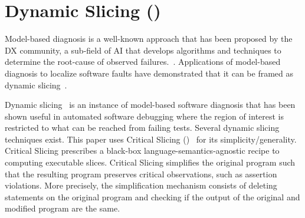 \documentclass{article}
\begin{document}

\section{Dynamic Slicing (\ds{})}
\label{sec:slicing}


Model-based diagnosis is a well-known approach that has been proposed by the
DX community, a sub-field of AI that develops algorithms and techniques to
determine the root-cause of observed failures.~\cite{REITER198757,DEKLEER200325}. Applications
of model-based diagnosis to localize software faults have demonstrated that it
can be framed as dynamic slicing~\cite{Mayer:2008:EMM:1642931.1642950,mayer2008prioritising}.

Dynamic slicing~\cite{Agrawal:1990:DPS:93542.93576}
is an instance of model-based software diagnosis that
has been shown useful in automated software debugging where the region
of interest is restricted to what can be reached from failing
tests. Several dynamic slicing techniques exist. This paper uses
Critical Slicing (\cs{})~\cite{DeMillo:1996:CSS:229000.226310} for its
simplicity/generality. Critical Slicing
prescribes a black-box language-semantics-agnostic recipe to computing
executable slices. Critical Slicing simplifies the original
program such that the resulting program preserves critical
observations, such as assertion violations. More precisely, the
simplification mechanism consists of deleting statements on the
original program and checking if the output of the original and
modified program are the same.
\end{document}

